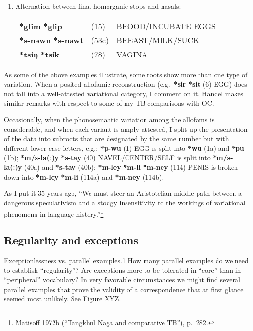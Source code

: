 \begin{enumerate}
\item %
Alternation between final homorganic stops and nasals:\nopagebreak[4]

\begin{tabular}{lll}
\textbf{*glim} \STEDTU{⪤} \textbf{*glip} 	&(15)	&BROOD/INCUBATE EGGS\\
\textbf{*s-nəwn} \STEDTU{⪤} \textbf{*s-nəwt} &(53c)	&BREAST/MILK/SUCK\\
\textbf{*tsiŋ} \STEDTU{⪤} \textbf{*tsik} &(78)	 	&VAGINA\\
\end{tabular}
\end{enumerate}


As some of the above examples illustrate, some roots show more than one type
of variation.  When a posited allofamic reconstruction (e.g.\ \textbf{*sir}  \textbf{*sit} (6)
EGG) does not fall into a well-attested variational category, I comment on it. 
Handel makes similar remarks with respect to some of my TB comparisons with OC.


Occasionally, when the phonosemantic variation among the allofams is
considerable, and when each variant is amply attested, I split up the
presentation of the data into subroots that are designated by the same number
but with different lower case letters, e.g.: \textbf{*p-wu} (1) EGG is split into \textbf{*wu}
(1a) and \textbf{*pu} (1b);
\textbf{*m/s-la(ː)y}  \textbf{*s-tay} (40) NAVEL/CENTER/SELF is split into
\textbf{*m/s-la(ː)y} (40a) and \textbf{*s-tay} (40b);
\textbf{*m-ley}  \textbf{*m-li}  \textbf{*m-ney} (114) PENIS is
broken down into \textbf{*m-ley}  \textbf{*m-li} (114a)
and \textbf{*m-ney} (114b).


As I put it 35 years ago, “We must steer an Aristotelian middle path between
a dangerous speculativism and a stodgy insensitivity to the workings of
variational phenomena in language history.”\footnote{Matisoff 1972b (“Tangkhul
Naga and comparative TB”), p.~282.}



\subsection{Regularity and exceptions}

Exceptionlessness vs. parallel examples.1  How many parallel examples do we need to establish “regularity”?  Are exceptions more to be tolerated in “core” than in “peripheral” vocabulary? In very favorable circumstances we might find several parallel examples that prove the validity of a correspondence that at first glance seemed most unlikely. See Figure XYZ.

